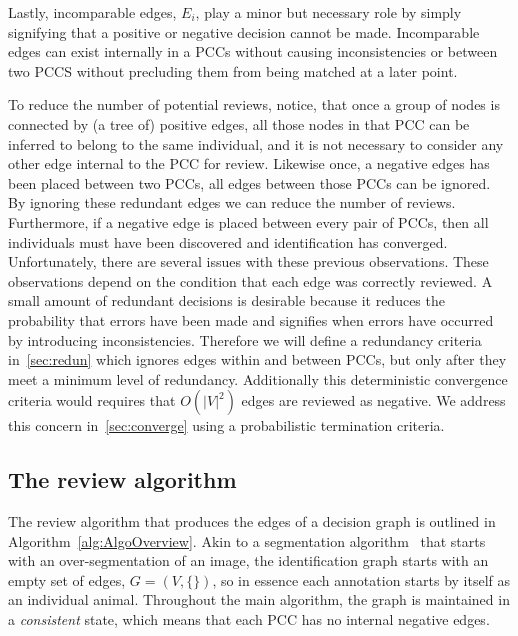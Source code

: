 Lastly, incomparable edges, $E_i$, play a minor but necessary role by simply signifying that a positive or negative
decision cannot be made.  Incomparable edges can exist internally in a PCCs without causing inconsistencies or
between two PCCS without precluding them from being matched at a later point.

To reduce the number of potential reviews, notice, that once a group of nodes is connected by (a tree of)
  positive edges, all those nodes in that PCC can be inferred to belong to the same individual, and it is not
  necessary to consider any other edge internal to the PCC for review.
Likewise once, a negative edges has been placed between two PCCs, all edges between those PCCs can be ignored.
By ignoring these redundant edges we can reduce the number of reviews.
Furthermore, if a negative edge is placed between every pair of PCCs, then all individuals must have been
  discovered and identification has converged.
Unfortunately, there are several issues with these previous observations.
These observations depend on the condition that each edge was correctly reviewed.
A small amount of redundant decisions is desirable because it reduces the probability that errors have been made
  and signifies when errors have occurred by introducing inconsistencies.
Therefore we will define a redundancy criteria in~\cref{sec:redun} which ignores edges within and between PCCs,
  but only after they meet a minimum level of redundancy.
Additionally this deterministic convergence criteria would requires that $O(|V|^2)$ edges are reviewed as
  negative.
We address this concern in~\cref{sec:converge} using a probabilistic termination criteria.


\subsection{The review algorithm}\label{sub:graphalgo}


The review algorithm that produces the edges of a decision graph is outlined in Algorithm~\ref{alg:AlgoOverview}.
Akin to a segmentation algorithm~\cite{fulkerson_class_2009} that starts with an over-segmentation of an image,
  the identification graph starts with an empty set of edges, $G = (V, \{ \})$, so in essence each annotation
  starts by itself as an individual animal.
Throughout the main algorithm, the graph is maintained in a \emph{consistent} state, which means that each PCC
  has no internal negative edges.

